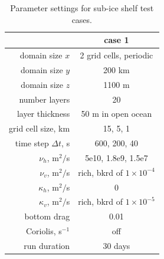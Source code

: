 \documentclass[11pt]{report}
\begin{document}
\begin{table}[tbh] 
\caption{Parameter settings for sub-ice shelf test cases.}
\vspace{0.5cm} \centering 
\begin{tabular}{r|c } 
\hline\hline & case 1 \\
\hline 
domain size $x$ &  2 grid cells, periodic \\
domain size $y$ & 200 km\\
domain size $z$ &  1100 m \\
number layers& 20 \\
layer thickness & 50 m in open ocean \\
grid cell size, km  & 15, 5, 1 \\
time step $\Delta t$, s & 600, 200, 40 \\
$\nu_h$, m$^2/$s & 5e10, 1.8e9, 1.5e7 \\
$\nu_v$, m$^2/$s & rich, bkrd of $1\times10^{-4}$ \\
$\kappa_h$, m$^2/$s & 0 \\
$\kappa_v$, m$^2/$s & rich, bkrd of $1\times10^{-5}$ \\
bottom drag & 0.01 \\
Coriolis, s$^{-1}$ & off \\
run duration& 30 days \\
\hline 
\end{tabular} \label{table:ideal test parameters}
\end{table}





\end{document}
